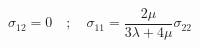 \begin{equation}
  \label{eq:CP_roots}
  \sigma_{12}=0 \quad ; \quad \sigma_{11}=\frac{2\mu}{3\lambda+4\mu}\sigma_{22}
\end{equation}




